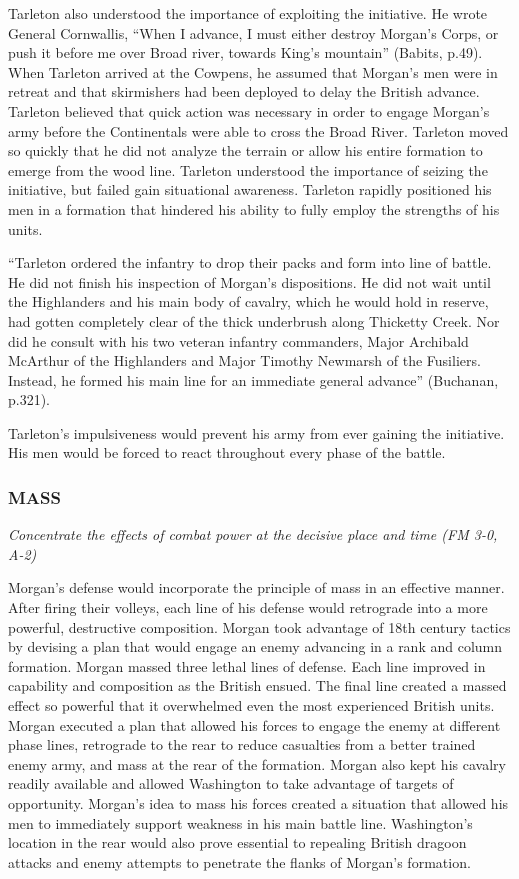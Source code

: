 Tarleton also understood the importance of exploiting the initiative.  He wrote
General Cornwallis, “When I advance, I must either destroy Morgan’s Corps, or
push it before me over Broad river, towards King’s mountain” (Babits, p.49).
When Tarleton arrived at the Cowpens, he assumed that Morgan’s men were in
retreat and that skirmishers had been deployed to delay the British advance.
Tarleton believed that quick action was necessary in order to engage Morgan’s
army before the Continentals were able to cross the Broad River.  Tarleton
moved so quickly that he did not analyze the terrain or allow his entire
formation to emerge from the wood line.  Tarleton understood the importance of
seizing the initiative, but failed gain situational awareness.  Tarleton
rapidly positioned his men in a formation that hindered his ability to fully
employ the strengths of his units.  

“Tarleton ordered the infantry to drop their packs and form into line of
battle.  He did not finish his inspection of Morgan’s dispositions.  He did not
wait until the Highlanders and his main body of cavalry, which he would hold in
reserve, had gotten completely clear of the thick underbrush along Thicketty
Creek.  Nor did he consult with his two veteran infantry commanders, Major
Archibald McArthur of the Highlanders and Major Timothy Newmarsh of the
Fusiliers.  Instead, he formed his main line for an immediate general advance”
(Buchanan, p.321).  

Tarleton’s impulsiveness would prevent his army from ever gaining the
initiative.  His men would be forced to react throughout every phase of the
battle. 

\subsubsection{MASS}

\textit{Concentrate the effects of combat power at the decisive place and time (FM 3-0, A-2)}

Morgan’s defense would incorporate the principle of mass in an effective
manner.  After firing their volleys, each line of his defense would retrograde
into a more powerful, destructive composition.  Morgan took advantage of 18th
century tactics by devising a plan that would engage an enemy advancing in a
rank and column formation.  Morgan massed three lethal lines of defense.  Each
line improved in capability and composition as the British ensued.  The final
line created a massed effect so powerful that it overwhelmed even the most
experienced British units.  Morgan executed a plan that allowed his forces to
engage the enemy at different phase lines, retrograde to the rear to reduce
casualties from a better trained enemy army, and mass at the rear of the
formation.  Morgan also kept his cavalry readily available and allowed
Washington to take advantage of targets of opportunity.  Morgan’s idea to mass
his forces created a situation that allowed his men to immediately support
weakness in his main battle line.  Washington’s location in the rear would also
prove essential to repealing British dragoon attacks and enemy attempts to
penetrate the flanks of Morgan’s formation.   

